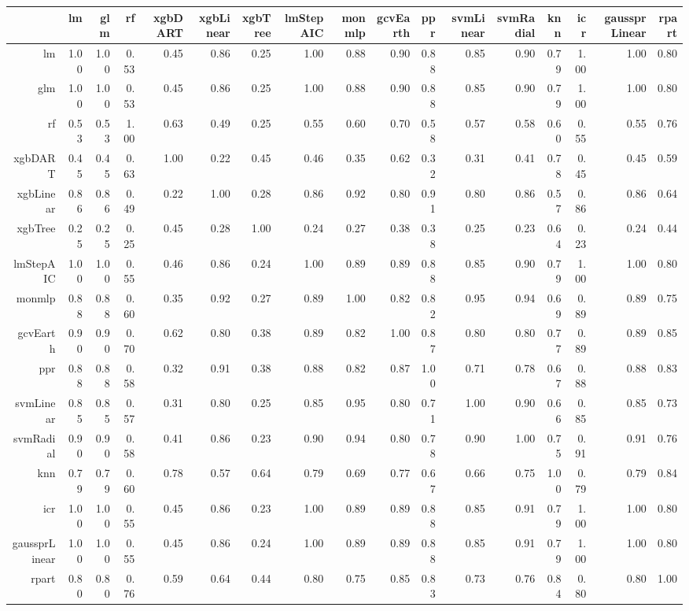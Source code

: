 \begin{table}[ht]
\centering
\begin{tabular}{rrrrrrrrrrrrrrrrr}
  \hline
 & lm & glm & rf & xgbDART & xgbLinear & xgbTree & lmStepAIC & monmlp & gcvEarth & ppr & svmLinear & svmRadial & knn & icr & gaussprLinear & rpart \\ 
  \hline
lm & 1.00 & 1.00 & 0.53 & 0.45 & 0.86 & 0.25 & 1.00 & 0.88 & 0.90 & 0.88 & 0.85 & 0.90 & 0.79 & 1.00 & 1.00 & 0.80 \\ 
  glm & 1.00 & 1.00 & 0.53 & 0.45 & 0.86 & 0.25 & 1.00 & 0.88 & 0.90 & 0.88 & 0.85 & 0.90 & 0.79 & 1.00 & 1.00 & 0.80 \\ 
  rf & 0.53 & 0.53 & 1.00 & 0.63 & 0.49 & 0.25 & 0.55 & 0.60 & 0.70 & 0.58 & 0.57 & 0.58 & 0.60 & 0.55 & 0.55 & 0.76 \\ 
  xgbDART & 0.45 & 0.45 & 0.63 & 1.00 & 0.22 & 0.45 & 0.46 & 0.35 & 0.62 & 0.32 & 0.31 & 0.41 & 0.78 & 0.45 & 0.45 & 0.59 \\ 
  xgbLinear & 0.86 & 0.86 & 0.49 & 0.22 & 1.00 & 0.28 & 0.86 & 0.92 & 0.80 & 0.91 & 0.80 & 0.86 & 0.57 & 0.86 & 0.86 & 0.64 \\ 
  xgbTree & 0.25 & 0.25 & 0.25 & 0.45 & 0.28 & 1.00 & 0.24 & 0.27 & 0.38 & 0.38 & 0.25 & 0.23 & 0.64 & 0.23 & 0.24 & 0.44 \\ 
  lmStepAIC & 1.00 & 1.00 & 0.55 & 0.46 & 0.86 & 0.24 & 1.00 & 0.89 & 0.89 & 0.88 & 0.85 & 0.90 & 0.79 & 1.00 & 1.00 & 0.80 \\ 
  monmlp & 0.88 & 0.88 & 0.60 & 0.35 & 0.92 & 0.27 & 0.89 & 1.00 & 0.82 & 0.82 & 0.95 & 0.94 & 0.69 & 0.89 & 0.89 & 0.75 \\ 
  gcvEarth & 0.90 & 0.90 & 0.70 & 0.62 & 0.80 & 0.38 & 0.89 & 0.82 & 1.00 & 0.87 & 0.80 & 0.80 & 0.77 & 0.89 & 0.89 & 0.85 \\ 
  ppr & 0.88 & 0.88 & 0.58 & 0.32 & 0.91 & 0.38 & 0.88 & 0.82 & 0.87 & 1.00 & 0.71 & 0.78 & 0.67 & 0.88 & 0.88 & 0.83 \\ 
  svmLinear & 0.85 & 0.85 & 0.57 & 0.31 & 0.80 & 0.25 & 0.85 & 0.95 & 0.80 & 0.71 & 1.00 & 0.90 & 0.66 & 0.85 & 0.85 & 0.73 \\ 
  svmRadial & 0.90 & 0.90 & 0.58 & 0.41 & 0.86 & 0.23 & 0.90 & 0.94 & 0.80 & 0.78 & 0.90 & 1.00 & 0.75 & 0.91 & 0.91 & 0.76 \\ 
  knn & 0.79 & 0.79 & 0.60 & 0.78 & 0.57 & 0.64 & 0.79 & 0.69 & 0.77 & 0.67 & 0.66 & 0.75 & 1.00 & 0.79 & 0.79 & 0.84 \\ 
  icr & 1.00 & 1.00 & 0.55 & 0.45 & 0.86 & 0.23 & 1.00 & 0.89 & 0.89 & 0.88 & 0.85 & 0.91 & 0.79 & 1.00 & 1.00 & 0.80 \\ 
  gaussprLinear & 1.00 & 1.00 & 0.55 & 0.45 & 0.86 & 0.24 & 1.00 & 0.89 & 0.89 & 0.88 & 0.85 & 0.91 & 0.79 & 1.00 & 1.00 & 0.80 \\ 
  rpart & 0.80 & 0.80 & 0.76 & 0.59 & 0.64 & 0.44 & 0.80 & 0.75 & 0.85 & 0.83 & 0.73 & 0.76 & 0.84 & 0.80 & 0.80 & 1.00 \\ 
   \hline
\end{tabular}
\end{table}
